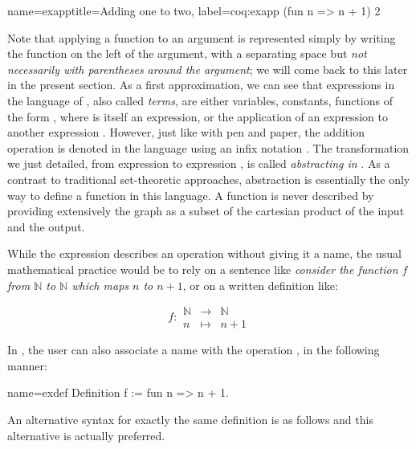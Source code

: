 \begin{coq}{name=exapp}{title=Adding one to two, label=coq:exapp}
  (fun n => n + 1) 2
\end{coq}
Note that applying a function to an argument is represented
simply by writing the function on the left of the argument,
with a separating space but {\em not
  necessarily with parentheses around the argument}; we will come back to this
later in the present section. As a first approximation, we can see
that expressions in the language of \Coq{}, also called \emph{terms},
are either variables, constants,
functions of the form , where  is itself an
expression, or the application  of an expression  to
another expression . However, just like with pen and paper, the addition
operation is denoted in the \Coq{} language using an infix notation \C{+}.
The transformation we just detailed, from expression  to expression
, is called \emph{abstracting  in  }.  As a contrast to traditional set-theoretic approaches,
abstraction is essentially the only way to define a function in this
language.  A function is never described by providing extensively the
graph as a subset of the cartesian product of the input and the output.

While the expression  describes an operation
without giving it a name, the usual mathematical practice would be to
rely on a sentence like {\em consider the function \(f\) from {\(\mathbb{N}\)}
to {\(\mathbb{N}\)} which maps \(n\) to \(n + 1\)}, or on a written
definition like:

\begin{equation}\label{equation:f}
f :
\begin{array}{ccc}
{\mathbb{N}} &\rightarrow& {\mathbb{N}}\\
n &\mapsto& n + 1
\end{array}
\end{equation}

In \Coq{}, the user can also associate a name with the operation
, in the following manner:

\begin{coq}{name=exdef}{}
Definition f := fun n => n + 1.
\end{coq}
An alternative syntax for exactly the same definition is as follows
and this alternative is actually preferred.

